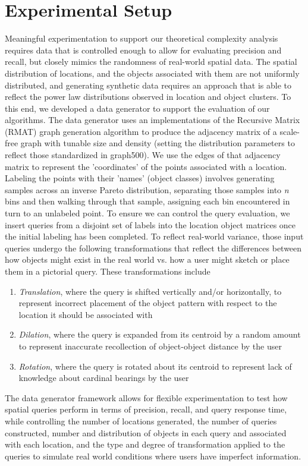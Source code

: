 \section{Experimental Setup}
\label{section:experimental_setup}


\par{
    Meaningful experimentation to support our theoretical complexity analysis requires data that is controlled enough to allow for evaluating precision and recall, but closely mimics the randomness of real-world spatial data.
    The spatial distribution of locations, and the objects associated with them are not uniformly distributed, and generating synthetic data requires an approach that is able to reflect the power law distributions observed in location and object clusters.  
    To this end, we developed a data generator to support the evaluation of our algorithms. 
    The data generator uses an implementations of the Recursive Matrix (RMAT) graph generation algorithm \cite{Chakrabarti2004} to produce the adjacency matrix of a scale-free graph with tunable size and density (setting the distribution parameters to reflect those standardized in graph500).
    We use the edges of that adjacency matrix to represent the 'coordinates' of the points associated with a location. 
    Labeling the points with their 'names' (object classes) involves generating samples across an inverse Pareto distribution, separating those samples into \textit{n} bins and then walking through that sample, assigning each bin encountered in turn to an unlabeled point.
    To ensure we can control the query evaluation, we insert queries from a disjoint set of labels into the location object matrices once the initial labeling has been completed. 
    To reflect real-world variance, those input queries undergo the following transformations that reflect the differences between how objects might exist in the real world vs. how a user might sketch or place them in a pictorial query.
    These transformations include 
    \begin{enumerate}
        \item \textit{Translation}, where the query is shifted vertically and/or horizontally, to represent incorrect placement of the object pattern with respect to the location it should be associated with
        \item \textit{Dilation}, where the query is expanded from its centroid by a random amount to represent inaccurate recollection of object-object distance by the user
        \item \textit{Rotation}, where the query is rotated about its centroid to represent lack of knowledge about cardinal bearings by the user
    \end{enumerate}


    The data generator framework allows for flexible experimentation to test how spatial queries perform in terms of precision, recall, and query response time, while controlling the number of locations generated, the number of queries constructed, number and distribution of objects in each query and associated with each location, and the type and degree of transformation applied to the queries to simulate real world conditions where users have imperfect information.
}
